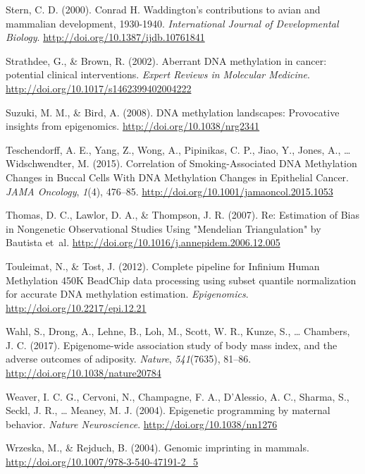 \documentclass[11pt,twoside]{bristolthesis}
\newlength{\cslhangindent}
\newenvironment{cslreferences}%
  {\setlength{\parindent}{0pt}%
  \everypar{\setlength{\hangindent}{\cslhangindent}}\ignorespaces}%
  {\par}
\begin{document}
\begin{cslreferences}
\leavevmode\hypertarget{ref-Stern2000}{}%
Stern, C. D. (2000). Conrad H. Waddington's contributions to avian and mammalian development, 1930-1940. \emph{International Journal of Developmental Biology}. \url{http://doi.org/10.1387/ijdb.10761841}

\leavevmode\hypertarget{ref-Strathdee2002}{}%
Strathdee, G., \& Brown, R. (2002). Aberrant DNA methylation in cancer: potential clinical interventions. \emph{Expert Reviews in Molecular Medicine}. \url{http://doi.org/10.1017/s1462399402004222}

\leavevmode\hypertarget{ref-Suzuki2008}{}%
Suzuki, M. M., \& Bird, A. (2008). DNA methylation landscapes: Provocative insights from epigenomics. \url{http://doi.org/10.1038/nrg2341}

\leavevmode\hypertarget{ref-Teschendorff2015}{}%
Teschendorff, A. E., Yang, Z., Wong, A., Pipinikas, C. P., Jiao, Y., Jones, A., \ldots{} Widschwendter, M. (2015). Correlation of Smoking-Associated DNA Methylation Changes in Buccal Cells With DNA Methylation Changes in Epithelial Cancer. \emph{JAMA Oncology}, \emph{1}(4), 476--85. \url{http://doi.org/10.1001/jamaoncol.2015.1053}

\leavevmode\hypertarget{ref-Thomas2007}{}%
Thomas, D. C., Lawlor, D. A., \& Thompson, J. R. (2007). Re: Estimation of Bias in Nongenetic Observational Studies Using "Mendelian Triangulation" by Bautista et~al. \url{http://doi.org/10.1016/j.annepidem.2006.12.005}

\leavevmode\hypertarget{ref-Touleimat2012}{}%
Touleimat, N., \& Tost, J. (2012). Complete pipeline for Infinium Human Methylation 450K BeadChip data processing using subset quantile normalization for accurate DNA methylation estimation. \emph{Epigenomics}. \url{http://doi.org/10.2217/epi.12.21}

\leavevmode\hypertarget{ref-Wahl2017}{}%
Wahl, S., Drong, A., Lehne, B., Loh, M., Scott, W. R., Kunze, S., \ldots{} Chambers, J. C. (2017). Epigenome-wide association study of body mass index, and the adverse outcomes of adiposity. \emph{Nature}, \emph{541}(7635), 81--86. \url{http://doi.org/10.1038/nature20784}

\leavevmode\hypertarget{ref-Weaver2004}{}%
Weaver, I. C. G., Cervoni, N., Champagne, F. A., D'Alessio, A. C., Sharma, S., Seckl, J. R., \ldots{} Meaney, M. J. (2004). Epigenetic programming by maternal behavior. \emph{Nature Neuroscience}. \url{http://doi.org/10.1038/nn1276}

\leavevmode\hypertarget{ref-Wrzeska2004}{}%
Wrzeska, M., \& Rejduch, B. (2004). Genomic imprinting in mammals. \url{http://doi.org/10.1007/978-3-540-47191-2_5}


\end{cslreferences}
\end{document}
